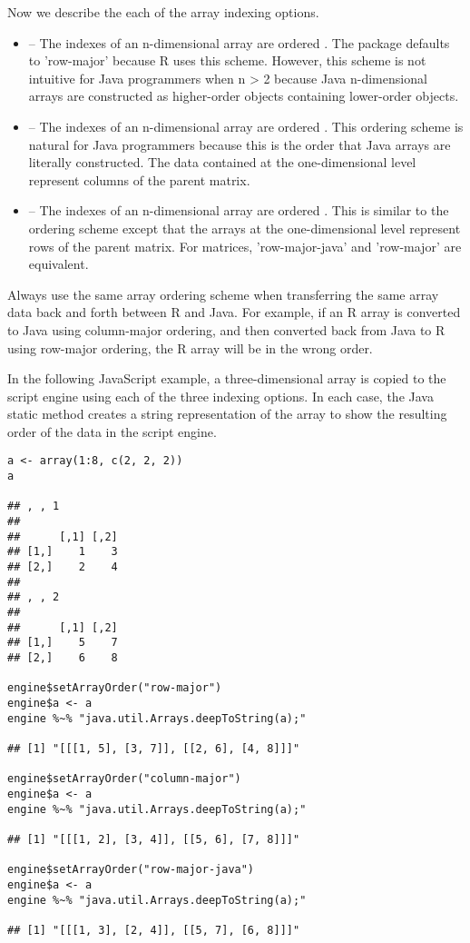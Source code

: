 Now we describe the each of the array indexing options.

\begin{itemize}
\item {} -- The indexes of an n-dimensional array are ordered \newline{}. The  package defaults to 'row-major' because R uses this scheme. However, this scheme is not intuitive for Java programmers when n > 2 because Java n-dimensional arrays are constructed as higher-order objects containing lower-order objects.

\item {} -- The indexes of an n-dimensional array are ordered \newline{}. This ordering scheme is natural for Java programmers because this is the order that Java arrays are literally constructed. The data contained at the one-dimensional level represent columns of the parent matrix.

\item {} -- The indexes of an n-dimensional array are ordered \newline{}. This is similar to the  ordering scheme except that the arrays at the one-dimensional level represent rows of the parent matrix. For matrices, 'row-major-java' and 'row-major' are equivalent.

\end{itemize}

 Always use the same array ordering scheme when transferring the same array data back and forth between R and Java. For example, if an R array is converted to Java using column-major ordering, and then converted back from Java to R using row-major ordering, the R array will be in the wrong order.

In the following JavaScript example, a three-dimensional array is copied to the script engine using each of the three indexing options. In each case, the Java static method  creates a string representation of the array to show the resulting order of the data in the script engine.

\begin{verbatim}
a <- array(1:8, c(2, 2, 2))
a

## , , 1
## 
##      [,1] [,2]
## [1,]    1    3
## [2,]    2    4
## 
## , , 2
## 
##      [,1] [,2]
## [1,]    5    7
## [2,]    6    8

engine$setArrayOrder("row-major")
engine$a <- a
engine %~% "java.util.Arrays.deepToString(a);"

## [1] "[[[1, 5], [3, 7]], [[2, 6], [4, 8]]]"

engine$setArrayOrder("column-major")
engine$a <- a
engine %~% "java.util.Arrays.deepToString(a);"

## [1] "[[[1, 2], [3, 4]], [[5, 6], [7, 8]]]"

engine$setArrayOrder("row-major-java")
engine$a <- a
engine %~% "java.util.Arrays.deepToString(a);"

## [1] "[[[1, 3], [2, 4]], [[5, 7], [6, 8]]]"
\end{verbatim}

